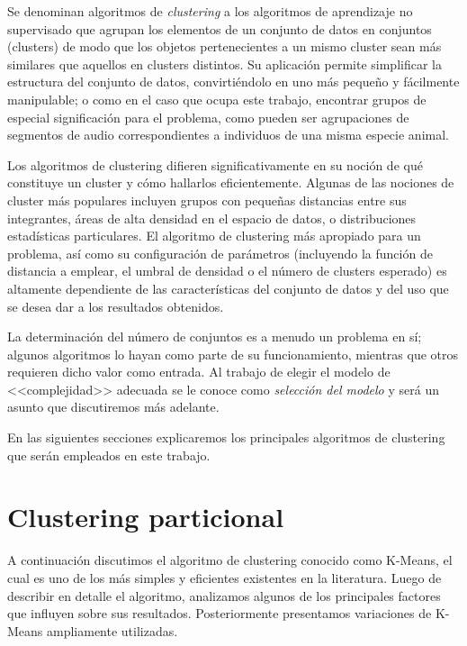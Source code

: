 Se denominan algoritmos de \textit{clustering} a los algoritmos de aprendizaje no supervisado que agrupan los elementos de un conjunto de datos en conjuntos (clusters) de modo que los objetos pertenecientes a un mismo cluster sean más similares que aquellos en clusters distintos.
Su aplicación permite simplificar la estructura del conjunto de datos, convirtiéndolo en uno más pequeño y fácilmente manipulable;
o como en el caso que ocupa este trabajo, encontrar grupos de especial significación para el problema, como pueden ser agrupaciones de segmentos de audio correspondientes a individuos de una misma especie animal.

Los algoritmos de clustering difieren significativamente en su noción de qué constituye un cluster y cómo hallarlos eficientemente.
Algunas de las nociones de cluster más populares incluyen grupos con pequeñas distancias entre sus integrantes, áreas de alta densidad en el espacio de datos, o distribuciones estadísticas particulares.
El algoritmo de clustering más apropiado para un problema, así como su configuración de parámetros (incluyendo la función de distancia a emplear, el umbral de densidad o el número de clusters esperado) es altamente dependiente de las características del conjunto de datos y del uso que se desea dar a los resultados obtenidos.

La determinación del número de conjuntos es a menudo un problema en sí;
algunos algoritmos lo hayan como parte de su funcionamiento, mientras que otros requieren dicho valor como entrada.
Al trabajo de elegir el modelo de <<complejidad>> adecuada se le conoce como \textit{selección del modelo} y será un asunto que discutiremos más adelante. %

En las siguientes secciones explicaremos los principales algoritmos de clustering que serán empleados en este trabajo.


\section{Clustering particional}\label{sec:clusteringParticional}

A continuación discutimos el algoritmo de clustering conocido como K-Means, el cual es uno de los más simples y eficientes existentes en la literatura.
Luego de describir en detalle el algoritmo, analizamos algunos de los principales factores que influyen sobre sus resultados.
Posteriormente presentamos variaciones de K-Means ampliamente utilizadas.

